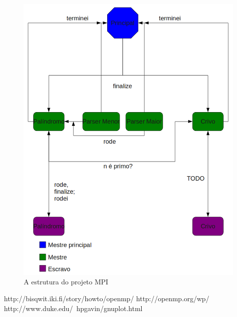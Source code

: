 \documentclass[a4paper]{article}
\begin{document}
\begin{figure}
	\includegraphics[scale=0.5]{mpi}
	\caption{A estrutura do projeto MPI}
	\label{mpi}
\end{figure}

\newpage
\begin{thebibliography}{99}
	http://bisqwit.iki.fi/story/howto/openmp/
	http://openmp.org/wp/
	http://www.duke.edu/~hpgavin/gnuplot.html
\end{thebibliography}
\end{document}
